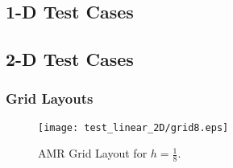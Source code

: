 \newpage
\subsection{1-D Test Cases}
\label{Results1D}

\newpage


\newpage


\newpage


\newpage


\newpage


\newpage


\newpage


\newpage


\newpage


\newpage
\subsection{2-D Test Cases}
\label{Results2D}

\subsubsection{Grid Layouts}
\begin{figure}[htbp]
\begin{center}
\texttt{[image: test\_linear\_2D/grid8.eps]}
\end{center}
\caption{AMR Grid Layout for $h = \frac18$.} \label{grid8_2D}
\end{figure}

\newpage


\newpage


\newpage


\newpage


\newpage


